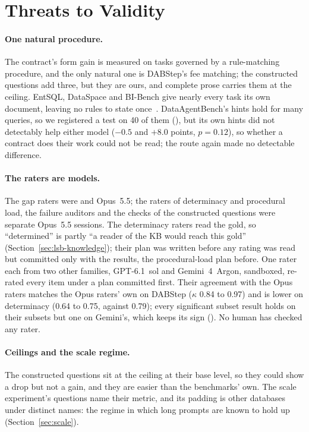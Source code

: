 \section{Threats to Validity}
\label{sec:threats}

\paragraph{One natural procedure.} The contract's form gain is measured on
tasks governed by a rule-matching procedure, and the only natural one is
DABStep's fee matching; the constructed questions add three, but they are
ours, and complete prose carries them at the ceiling. EntSQL, DataSpace and
BI-Bench give nearly every task its own document, leaving no rules to state
once~\cite{entsql,dataspace,bi-bench}. DataAgentBench's hints hold for many
queries, so we registered a test on 40 of them (), but its
own hints did not detectably help either model ($-0.5$ and $+8.0$ points,
$p{=}0.12$), so whether a contract does their work could not be read; the
route again made no detectable difference.

\paragraph{The raters are models.} The gap raters were \mSol{} and
Opus~5.5; the raters of determinacy and procedural load, the failure
auditors and the checks of the constructed questions were separate
Opus~5.5 sessions. The determinacy raters read the gold, so
``determined'' is partly ``a reader of the KB would reach this gold''
(Section~\ref{sec:lsb-knowledge}); their plan was written before any
rating was read but committed only with the results, the procedural-load
plan before. One rater each from two other families, GPT-6.1~sol and
Gemini~4~Argon, sandboxed, re-rated every item under a plan committed
first. Their agreement with the Opus raters matches the Opus raters' own
on DABStep ($\kappa$ 0.84 to 0.97) and is lower on determinacy (0.64 to
0.75, against 0.79); every significant subset result holds on their
subsets but one on Gemini's, which keeps its sign
(). No human has checked any rater.

\ifextended
\paragraph{Ceilings and the scale regime.} The constructed questions sit at
the ceiling at their base level, so they could show a drop but not a gain,
and they are easier than the benchmarks' own. The scale experiment's
questions name their metric, and its padding is other databases under
distinct names: the regime in which long prompts are known to hold up
(Section~\ref{sec:scale}).
\fi

